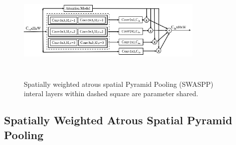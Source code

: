 \begin{center}
\begin{figure}[htbp]
\centerline{\includegraphics[height=50mm,width=9cm]{Figures/SWASPP.PNG}}
\caption{Spatially weighted atrous spatial Pyramid Pooling (SWASPP) interal layers within dashed square are parameter shared.}
\label{swaspp}
\end{figure}
\end{center}

\subsection{Spatially Weighted Atrous Spatial Pyramid Pooling}

